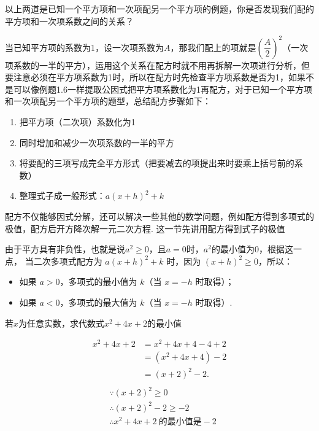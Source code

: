 \documentclass[lang=cn, 10pt, titlestyle=display, oneside]{elegantbook}
\begin{document}
以上两道是已知一个平方项和一次项配另一个平方项的例题，你是否发现我们配的平方项和一次项系数之间的关系？
\par
当已知平方项的系数为1，设一次项系数为\(A\)，那我们配上的项就是\((\dfrac{A}{2})^2\)（一次项系数的一半的平方），运用这个关系在配方时就不用再拆解一次项进行分析，但要注意必须在平方项系数为1时，所以在配方时先检查平方项系数是否为1，如果不是可以像例题1.6一样提取公因式把平方项系数化为1再配方，对于已知一个平方项和一次项配另一个平方项的题型，总结配方步骤如下：
\begin{enumerate}
    \item 把平方项（二次项）系数化为1
    \item 同时增加和减少一次项系数的一半的平方
    \item 将要配的三项写成完全平方形式（把要减去的项提出来时要乘上括号前的系数）
    \item 整理式子成一般形式：\( a(x + h)^2 + k \)
\end{enumerate}
\par
配方不仅能够因式分解，还可以解决一些其他的数学问题，例如配方得到多项式的极值，配方后开方降次解一元二次方程. 这一节先讲用配方得到式子的极值
\par
由于平方具有非负性，也就是说\(a^2\geq0\)，且\(a=0\)时，\(a^2\)的最小值为0，根据这一点，
当二次多项式配方为 \( a(x + h)^2 + k \) 时，因为 \( (x + h)^2 \geq 0 \)，所以：
\newline
\begin{itemize}[label=]
    \item 如果 \( a > 0 \)，多项式的最小值为 \( k \)（当 \( x = -h \) 时取得）；
    \item 如果 \( a < 0 \)，多项式的最大值为 \( k \)（当 \( x = -h \) 时取得）.
\end{itemize}

\begin{example}
若\(x\)为任意实数，求代数式\(x^2+4x+2\)的最小值
\end{example}

\begin{solution}

\begin{align*}
x^2 + 4x + 2 &= x^2 + 4x + 4 - 4 + 2 \\
&= (x^2 + 4x + 4) - 2 \\
&= (x + 2)^2 - 2.\\
\end{align*}
\begin{align*}
&\because (x + 2)^2 \geq 0\\
&\therefore (x + 2)^2-2 \geq -2\\
&\therefore x^2 + 4x + 2 \  \text{的最小值是}-2
\end{align*}
\end{solution}
\end{document}
